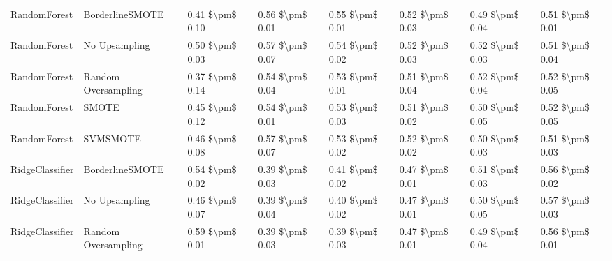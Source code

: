 \begin{tabular}{llllllll}
                   RandomForest &               BorderlineSMOTE &     0.41 \$\textbackslash pm\$ 0.10 &           0.56 \$\textbackslash pm\$ 0.01 &       0.55 \$\textbackslash pm\$ 0.01 &        0.52 \$\textbackslash pm\$ 0.03 &                         0.49 \$\textbackslash pm\$ 0.04 & 0.51 \$\textbackslash pm\$ 0.01 \\
                   RandomForest &                 No Upsampling &     0.50 \$\textbackslash pm\$ 0.03 &           0.57 \$\textbackslash pm\$ 0.07 &       0.54 \$\textbackslash pm\$ 0.02 &        0.52 \$\textbackslash pm\$ 0.03 &                         0.52 \$\textbackslash pm\$ 0.03 & 0.51 \$\textbackslash pm\$ 0.04 \\
                   RandomForest &           Random Oversampling &     0.37 \$\textbackslash pm\$ 0.14 &           0.54 \$\textbackslash pm\$ 0.04 &       0.53 \$\textbackslash pm\$ 0.01 &        0.51 \$\textbackslash pm\$ 0.04 &                         0.52 \$\textbackslash pm\$ 0.04 & 0.52 \$\textbackslash pm\$ 0.05 \\
                   RandomForest &                         SMOTE &     0.45 \$\textbackslash pm\$ 0.12 &           0.54 \$\textbackslash pm\$ 0.01 &       0.53 \$\textbackslash pm\$ 0.03 &        0.51 \$\textbackslash pm\$ 0.02 &                         0.50 \$\textbackslash pm\$ 0.05 & 0.52 \$\textbackslash pm\$ 0.05 \\
                   RandomForest &                      SVMSMOTE &     0.46 \$\textbackslash pm\$ 0.08 &           0.57 \$\textbackslash pm\$ 0.07 &       0.53 \$\textbackslash pm\$ 0.02 &        0.52 \$\textbackslash pm\$ 0.02 &                         0.50 \$\textbackslash pm\$ 0.03 & 0.51 \$\textbackslash pm\$ 0.03 \\
                RidgeClassifier &               BorderlineSMOTE &     0.54 \$\textbackslash pm\$ 0.02 &           0.39 \$\textbackslash pm\$ 0.03 &       0.41 \$\textbackslash pm\$ 0.02 &        0.47 \$\textbackslash pm\$ 0.01 &                         0.51 \$\textbackslash pm\$ 0.03 & 0.56 \$\textbackslash pm\$ 0.02 \\
                RidgeClassifier &                 No Upsampling &     0.46 \$\textbackslash pm\$ 0.07 &           0.39 \$\textbackslash pm\$ 0.04 &       0.40 \$\textbackslash pm\$ 0.02 &        0.47 \$\textbackslash pm\$ 0.01 &                         0.50 \$\textbackslash pm\$ 0.05 & 0.57 \$\textbackslash pm\$ 0.03 \\
                RidgeClassifier &           Random Oversampling &     0.59 \$\textbackslash pm\$ 0.01 &           0.39 \$\textbackslash pm\$ 0.03 &       0.39 \$\textbackslash pm\$ 0.03 &        0.47 \$\textbackslash pm\$ 0.01 &                         0.49 \$\textbackslash pm\$ 0.04 & 0.56 \$\textbackslash pm\$ 0.01 \\

\end{tabular}
